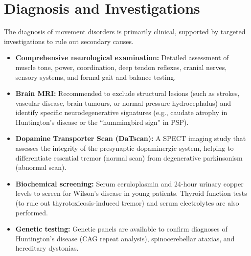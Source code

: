 \section*{Diagnosis and Investigations}
The diagnosis of movement disorders is primarily clinical, supported by targeted investigations to rule out secondary causes.
\begin{itemize}
    \item \textbf{Comprehensive neurological examination:} Detailed assessment of muscle tone, power, coordination, deep tendon reflexes, cranial nerves, sensory systems, and formal gait and balance testing.
    \item \textbf{Brain MRI:} Recommended to exclude structural lesions (such as strokes, vascular disease, brain tumours, or normal pressure hydrocephalus) and identify specific neurodegenerative signatures (e.g., caudate atrophy in Huntington's disease or the ``hummingbird sign'' in PSP).
    \item \textbf{Dopamine Transporter Scan (DaTscan):} A SPECT imaging study that assesses the integrity of the presynaptic dopaminergic system, helping to differentiate essential tremor (normal scan) from degenerative parkinsonism (abnormal scan).
    \item \textbf{Biochemical screening:} Serum ceruloplasmin and 24-hour urinary copper levels to screen for Wilson's disease in young patients. Thyroid function tests (to rule out thyrotoxicosis-induced tremor) and serum electrolytes are also performed.
    \item \textbf{Genetic testing:} Genetic panels are available to confirm diagnoses of Huntington's disease (CAG repeat analysis), spinocerebellar ataxias, and hereditary dystonias.
\end{itemize}

